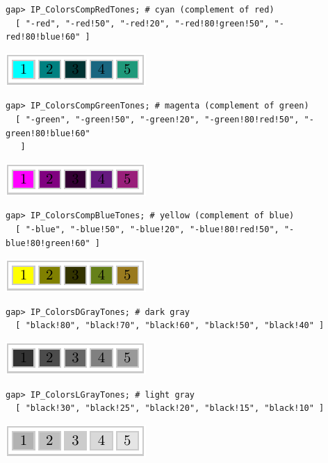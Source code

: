 \documentclass[a4paper,11pt]{report}
\begin{document}
{{\begin{center}
\end{center}   
\begin{Verbatim}[fontsize=\small,frame=single,label=cyan]
  gap> IP_ColorsCompRedTones; # cyan (complement of red)
  [ "-red", "-red!50", "-red!20", "-red!80!green!50", "-red!80!blue!60" ]
\end{Verbatim}
  \begin{center} \includegraphics[scale=1.2]{../images/comp_red_tones.pdf}
\end{center}   
\begin{Verbatim}[fontsize=\small,frame=single,label=magenta]
  gap> IP_ColorsCompGreenTones; # magenta (complement of green)
  [ "-green", "-green!50", "-green!20", "-green!80!red!50", "-green!80!blue!60" 
   ]
\end{Verbatim}
  \begin{center} \includegraphics[scale=1.2]{../images/comp_green_tones.pdf}
\end{center}   
\begin{Verbatim}[fontsize=\small,frame=single,label=yellow]
  gap> IP_ColorsCompBlueTones; # yellow (complement of blue)
  [ "-blue", "-blue!50", "-blue!20", "-blue!80!red!50", "-blue!80!green!60" ]
\end{Verbatim}
  \begin{center} \includegraphics[scale=1.2]{../images/comp_blue_tones.pdf}
\end{center}   
\begin{Verbatim}[fontsize=\small,frame=single,label=dark gray]
  gap> IP_ColorsDGrayTones; # dark gray
  [ "black!80", "black!70", "black!60", "black!50", "black!40" ]
\end{Verbatim}
  \begin{center} \includegraphics[scale=1.2]{../images/dark_gray_tones.pdf}
\end{center}   
\begin{Verbatim}[fontsize=\small,frame=single,label=light gray]
  gap> IP_ColorsLGrayTones; # light gray
  [ "black!30", "black!25", "black!20", "black!15", "black!10" ]
\end{Verbatim}
  \begin{center} \includegraphics[scale=1.2]{../images/light_gray_tones.pdf}
\end{center}   }

}
\end{document}
